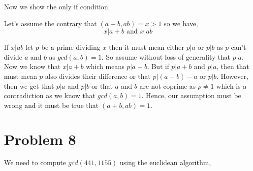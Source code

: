 \documentclass[a4paper]{report}
\begin{document}
Now we show the only if condition.


Let's assume the contrary that $(a + b, ab ) = x > 1$ so we have,  
$$ x | a + b \text{ and } x | ab $$

If $x | ab$ let $p$ be a prime dividing $x$ then it must mean either  $p | a$ or $p | b$ as  $p$ can't divide  $a$ and  $b$ as   $gcd(a, b) = 1$. So assume without loss of generality that $ p | a$. Now we know that $x | a + b$ which means $p | a + b$. But if $p | a + b$ and $p | a$, then that must mean  $p$ also divides their difference or that $p | (a + b) - a$ or  $ p | b$. However, then we get that  $p | a$ and  $p | b$  or that $a$ and $b$ are not coprime as $p \ne 1$ which is a contradiction as we know that $gcd(a, b) = 1$. Hence, our assumption  must be wrong and it must be true that $(a + b, ab) = 1$. 


\section*{Problem 8}
We need to compute $gcd(441, 1155) $ using the euclidean algorithm,
\end{document}
